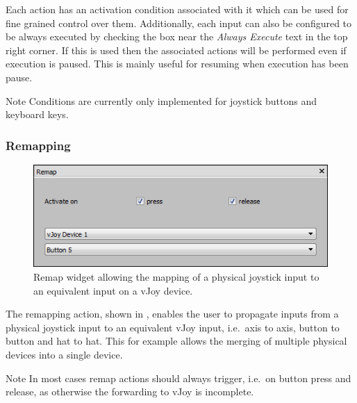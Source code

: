 \documentclass[a4, 10pt]{article}
\begin{document}
Each action has an activation condition associated with it which can be
used for fine grained control over them. Additionally, each input can
also be configured to be always executed by checking the box near the
\emph{Always Execute} text in the top right corner. If this is used then
the associated actions will be performed even if execution is paused.
This is mainly useful for resuming when execution has been pause.

\vspace{1em}
\begin{bclogo}[
    couleur=yellow!40,
    couleurBord=orange!80,
    couleurBarre=orange!80,
    arrondi=0.1,
    logo=\bcinfo
]{Note}
    Conditions are currently only implemented for joystick buttons and
    keyboard keys.
\end{bclogo}


\subsubsection{Remapping}

\begin{figure}[bt]
    \centering

    \includegraphics[width=0.75\linewidth]{images/action_remap}
    \caption{Remap widget allowing the mapping of a physical joystick
        input to an equivalent input on a vJoy device.}
    \label{fig:action_remap}
\end{figure}

The remapping action, shown in , enables the user
to propagate inputs from a physical joystick input to an equivalent vJoy
input, i.e.\ axis to axis, button to button and hat to hat.  This for
example allows the merging of multiple physical devices into a single
device.

\vspace{1em}
\begin{bclogo}[
    couleur=yellow!40,
    couleurBord=orange!80,
    couleurBarre=orange!80,
    arrondi=0.1,
    logo=\bcinfo
]{Note}
    In most cases remap actions should always trigger, i.e.\ on button press and
    release, as otherwise the forwarding to vJoy is incomplete.
\end{bclogo}
\end{document}
